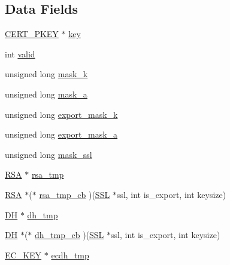 \subsection*{Data Fields}
\begin{DoxyCompactItemize}
\item 
\hyperlink{ssl__locl_8h_ab376b10820d145fbabe4f4fdf0b3a770}{C\+E\+R\+T\+\_\+\+P\+K\+EY} $\ast$ \hyperlink{structcert__st_afc02d65986dcb23f43889144cbaba6c3}{key}
\item 
int \hyperlink{structcert__st_ac63b1f168765a53e565a8ba27f5469d1}{valid}
\item 
unsigned long \hyperlink{structcert__st_a3c55369e7b44f6d24e0144acd29249db}{mask\+\_\+k}
\item 
unsigned long \hyperlink{structcert__st_a7ac5672fb07289995fdf7c182f6c21ac}{mask\+\_\+a}
\item 
unsigned long \hyperlink{structcert__st_aaf4a59c7fc3c59eb07c20e752d7db1da}{export\+\_\+mask\+\_\+k}
\item 
unsigned long \hyperlink{structcert__st_ab5a08f89823ef1cacbb84792d44d5a36}{export\+\_\+mask\+\_\+a}
\item 
unsigned long \hyperlink{structcert__st_af79c19cff62732da694ee0fb3d8b5a53}{mask\+\_\+ssl}
\item 
\hyperlink{crypto_2ossl__typ_8h_a9ad4496a11f0a9f686bea793cb97f8b5}{R\+SA} $\ast$ \hyperlink{structcert__st_a64e6e76e48d7b645c50717aee25fb6cd}{rsa\+\_\+tmp}
\item 
\hyperlink{crypto_2ossl__typ_8h_a9ad4496a11f0a9f686bea793cb97f8b5}{R\+SA} $\ast$($\ast$ \hyperlink{structcert__st_a1d3a53161b19cb88960dcc158bc5efe5}{rsa\+\_\+tmp\+\_\+cb} )(\hyperlink{crypto_2ossl__typ_8h_a71f21e09bf365489dab9d85bd4785e24}{S\+SL} $\ast$ssl, int is\+\_\+export, int keysize)
\item 
\hyperlink{crypto_2ossl__typ_8h_a5a5072cfe75a51d0ff201c0a8d2d68b2}{DH} $\ast$ \hyperlink{structcert__st_afdfb4bed7c2a22d4ca12652a4b38a718}{dh\+\_\+tmp}
\item 
\hyperlink{crypto_2ossl__typ_8h_a5a5072cfe75a51d0ff201c0a8d2d68b2}{DH} $\ast$($\ast$ \hyperlink{structcert__st_a073f62de068badf5d62813f41001b4f3}{dh\+\_\+tmp\+\_\+cb} )(\hyperlink{crypto_2ossl__typ_8h_a71f21e09bf365489dab9d85bd4785e24}{S\+SL} $\ast$ssl, int is\+\_\+export, int keysize)
\item 
\hyperlink{crypto_2ec_2ec_8h_a756878ae60b2fc17d4217e77ffe5e0d3}{E\+C\+\_\+\+K\+EY} $\ast$ \hyperlink{structcert__st_a3b9464ad2cb5fec0673874f9e6502e10}{ecdh\+\_\+tmp}
\item 

\end{DoxyCompactItemize}
